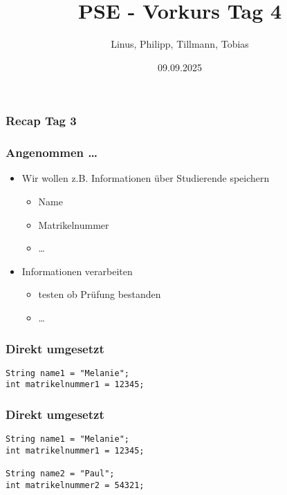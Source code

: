 \documentclass{../../presentation}
\title{PSE - Vorkurs Tag 4}
\author{Linus, Philipp, Tillmann, Tobias}
\institute{FIUS - Fachgruppe Informatik Universität Stuttgart}
\date{09.09.2025}
\begin{document}
\begin{frame}
	\titlepage
\end{frame}

\begin{frame}
	\listoftodos
\end{frame}

\begin{frame}
	\frametitle{Recap Tag 3}
\end{frame}


\begin{frame}
	\frametitle{Angenommen \dots}
	\begin{itemize}
		\item Wir wollen z.B. Informationen über Studierende speichern
		      \begin{itemize}
			      \item<2->[\textbullet] Name
			      \item<3->[\textbullet] Matrikelnummer
			      \item<4->[\textbullet] \dots
		      \end{itemize}
		\item<5-> Informationen verarbeiten
		      \begin{itemize}
			      \item<6->[\textbullet] testen ob Prüfung bestanden
			      \item<7->[\textbullet] \dots
		      \end{itemize}
	\end{itemize}
\end{frame}



\begin{frame}[fragile,t]
	\frametitle{Direkt umgesetzt}
	\vspace{2.0em}
	\begin{minipage}[t][0.6\textheight][t]{\textwidth}
		\begin{verbatim}
String name1 = "Melanie";
int matrikelnummer1 = 12345;
\end{verbatim}
	\end{minipage}
\end{frame}



\begin{frame}[fragile,t]
	\frametitle{Direkt umgesetzt}
	\vspace{2.0em}
	\begin{minipage}[t][0.6\textheight][t]{\textwidth}
		\begin{verbatim}
String name1 = "Melanie";
int matrikelnummer1 = 12345;

String name2 = "Paul";
int matrikelnummer2 = 54321;
\end{verbatim}
	\end{minipage}
\end{frame}
\end{document}
